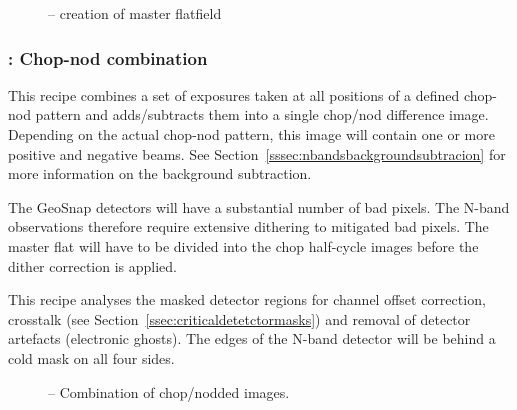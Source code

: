 

\begin{figure}[hb]
  \centering
    \def \globalscale {0.700000}
    \fontsize{10}{12}\selectfont
    
  \caption[Recipe: ]{ --
    creation of  master flatfield}
  \label{fig:metis_n_img_flat}
\end{figure}

\subsubsection{:  Chop-nod combination}
\label{img_n_chopnod}
\label{rec:img_n_chopnod}
\label{rec:metis_n_img_chopnod}
\label{sssec:img_n_chopnod}

This recipe combines a set of exposures taken at all positions of a
defined chop-nod pattern and adds/subtracts them into a single
chop/nod difference image. Depending on the actual chop-nod pattern,
this image will contain one or more positive and negative beams.
See Section~\ref{sssec:nbandsbackgroundsubtracion} for more information
on the background subtraction.

The GeoSnap detectors will have a substantial number of bad pixels.
The N-band observations therefore require extensive dithering to mitigated bad pixels.
The master flat will have to be divided into the chop half-cycle images before the dither correction is applied.

This recipe analyses the masked detector regions for channel offset correction, crosstalk (see Section~\ref{ssec:criticaldetetctormasks}) and removal of detector artefacts (electronic ghosts).
The edges of the N-band detector will be behind a cold mask on all four sides.




 \begin{figure}[hb]
  \centering
  \def \globalscale {0.700000}
  \fontsize{10}{12}\selectfont
  
   \caption[Recipe: ]{ --
     Combination of chop/nodded images.}
   \label{fig:metis_n_img_chopnod}
 \end{figure}
\restoregeometry

